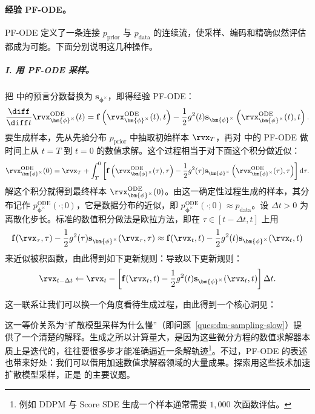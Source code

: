 \paragraph{经验 PF-ODE。}
PF-ODE 定义了一条连接 $p_{\mathrm{prior}}$ 与 $p_{\mathrm{data}}$ 的连续流，使采样、编码和精确似然评估都成为可能。下面分别说明这几种操作。
\subparagraph{I. 用 PF-ODE 采样。} 把  中的预言分数替换为 $\mathbf{s}_{\bm{\phi}^\times}$，即得经验 PF-ODE：
\begin{equation}\label{eq:prob_ode_sub}
    \frac{\diff}{\diff t} \rvx^{\mathrm{ODE}}_{\bm{\phi}^\times}(t) = \mathbf{f}\left(\rvx^{\mathrm{ODE}}_{\bm{\phi}^\times}(t), t\right) - \frac{1}{2} g^2(t) \mathbf{s}_{\bm{\phi}^\times}\left(\rvx^{\mathrm{ODE}}_{\bm{\phi}^\times}(t), t\right).
\end{equation}
要生成样本，先从先验分布 $p_{\mathrm{prior}}$ 中抽取初始样本 $\rvx_T$，再对  中的 PF-ODE 做时间上从 $t=T$ 到 $t=0$ 的数值求解。这个过程相当于对下面这个积分做近似：
\[
\rvx^{\mathrm{ODE}}_{\bm{\phi}^\times}(0) = \rvx_T + \int_T^0 \left[ \mathbf{f}\left(\rvx^{\mathrm{ODE}}_{\bm{\phi}^\times}(\tau), \tau\right) - \frac{1}{2} g^2(\tau) \mathbf{s}_{\bm{\phi}^\times}\left(\rvx^{\mathrm{ODE}}_{\bm{\phi}^\times}(\tau), \tau\right) \right] \mathrm{d}\tau.
\]
解这个积分就得到最终样本 $\rvx^{\mathrm{ODE}}_{\bm{\phi}^\times}(0)$。由这一确定性过程生成的样本，其分布记作 $p_{\bm{\phi}^\times}^{\mathrm{ODE}}(\cdot; 0)$，它是数据分布的近似，即 $p_{\bm{\phi}^\times}^{\mathrm{ODE}}(\cdot; 0) \approx p_{\mathrm{data}}$。设 $\Delta t > 0$ 为离散化步长。标准的数值积分做法是欧拉方法，即在 $\tau \in [t-\Delta t, t]$ 上用
\[
\mathbf{f}(\rvx_\tau, \tau) - \frac{1}{2} g^2(\tau)
\mathbf{s}_{\bm{\phi}^\times}(\rvx_\tau, \tau) \approx \mathbf{f}(\rvx_t, t) - \frac{1}{2} g^2(t)
\mathbf{s}_{\bm{\phi}^\times}(\rvx_t, t)
\]
来近似被积函数，由此得到如下更新规则：导致以下更新规则：
\begin{equation}\label{eq:euler-ode}
\rvx_{t - \Delta t} \leftarrow \rvx_t -
\left[ \mathbf{f}(\rvx_t, t) - \frac{1}{2} g^2(t)
\mathbf{s}_{\bm{\phi}^\times}(\rvx_t, t) \right] \Delta t.
\end{equation}


这一联系让我们可以换一个角度看待生成过程，由此得到一个核心洞见：

这一等价关系为“扩散模型采样为什么慢”（即问题~\ref{ques:dm-sampling-slow}）提供了一个清楚的解释。生成之所以计算量大，是因为这些微分方程的数值求解器本质上是迭代的，往往要很多步才能准确逼近一条解轨迹\footnote{例如 DDPM 与 Score SDE 生成一个样本通常需要 $1{,}000$ 次函数评估。}。不过，PF-ODE 的表述也带来好处：我们可以借用加速数值求解器领域的大量成果。探索用这些技术加速扩散模型采样，正是  的主要议题。

